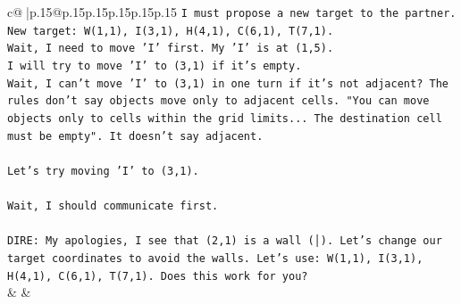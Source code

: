 \documentclass{article}
\begin{document}
{\begin{supertabular}{c@{$\;$}|p{.15\linewidth}@{}p{.15\linewidth}p{.15\linewidth}p{.15\linewidth}p{.15\linewidth}p{.15\linewidth}}
{{{\texttt{I must propose a new target to the partner.} \\
\texttt{New target: W(1,1), I(3,1), H(4,1), C(6,1), T(7,1).} \\
\texttt{Wait, I need to move 'I' first. My 'I' is at (1,5).} \\
\texttt{I will try to move 'I' to (3,1) if it's empty.} \\
\texttt{Wait, I can't move 'I' to (3,1) in one turn if it's not adjacent? The rules don't say objects move only to adjacent cells. "You can move objects only to cells within the grid limits... The destination cell must be empty". It doesn't say adjacent.} \\
\\ 
\texttt{Let's try moving 'I' to (3,1).} \\
\\ 
\texttt{Wait, I should communicate first.} \\
\\ 
\texttt{DIRE: My apologies, I see that (2,1) is a wall (│). Let's change our target coordinates to avoid the walls. Let's use: W(1,1), I(3,1), H(4,1), C(6,1), T(7,1). Does this work for you?} \\
            }
        }
    }
    & & \\ \\


\end{supertabular}}
\end{document}
